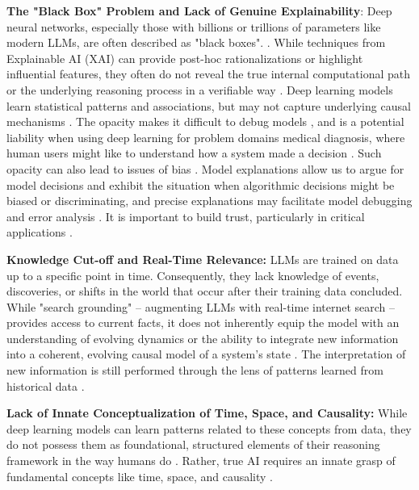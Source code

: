 \textbf{The "Black Box" Problem and Lack of Genuine Explainability}: Deep neural networks, especially those with billions or trillions of parameters like modern LLMs, are often described as "black boxes". \cite{Scholkopf2021Toward, Kaddour2022Causal}. While techniques from Explainable AI (XAI) can provide post-hoc rationalizations or highlight influential features, they often do not reveal the true internal computational path or the underlying reasoning process in a verifiable way \cite{Scholkopf2021Toward, Kaddour2022Causal, wolff2018solutions}. Deep learning models learn statistical patterns and associations, but may not capture underlying causal mechanisms \cite{Scholkopf2021Toward}. The opacity makes it difficult to debug models \cite{Moraffah2020Causal}, and is a potential liability when using deep learning for problem domains medical diagnosis, where human users might like to understand how a system made a decision \cite{Moraffah2020Causal}. Such opacity can also lead to issues of bias \cite{Moraffah2020Causal}. Model explanations allow us to argue for model decisions and exhibit the situation when algorithmic decisions might be biased or discriminating, and precise explanations may facilitate model debugging and error analysis \cite{Moraffah2020Causal}. It is important to build trust, particularly in critical applications \cite{Moraffah2020Causal}.

\textbf{Knowledge Cut-off and Real-Time Relevance: }LLMs are trained on data up to a specific point in time. Consequently, they lack knowledge of events, discoveries, or shifts in the world that occur after their training data concluded. While "search grounding" – augmenting LLMs with real-time internet search – provides access to current facts, it does not inherently equip the model with an understanding of evolving dynamics or the ability to integrate new information into a coherent, evolving causal model of a system's state \cite{Scholkopf2021Toward}. The interpretation of new information is still performed through the lens of patterns learned from historical data \cite{Scholkopf2021Toward}.


\textbf{Lack of Innate Conceptualization of Time, Space, and Causality: } While deep learning models can learn patterns related to these concepts from data, they do not possess them as foundational, structured elements of their reasoning framework in the way humans do \cite{Davis2015Commonsense, Marcus2018Deep, Pearl2009Causality, Scholkopf2021Toward}. Rather, true AI requires an innate grasp of fundamental concepts like time, space, and causality \cite{Pearl2009Causality, Scholkopf2021Toward, Kaddour2022Causal, bishop2020artificialintelligencestupidcausal}.

